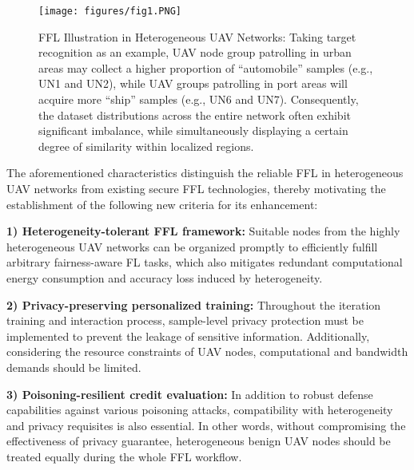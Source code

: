 \documentclass[lettersize,journal]{IEEEtran}
\begin{document}
\begin{figure}[!t]
\centering
\texttt{[image: figures/fig1.PNG]}
\caption{FFL Illustration in Heterogeneous UAV Networks: Taking target recognition as an example, UAV node group patrolling in urban areas may collect a higher proportion of ``automobile'' samples (e.g., UN1 and UN2), while UAV groups patrolling in port areas will acquire more ``ship'' samples (e.g., UN6 and UN7). Consequently, the dataset distributions across the entire network often exhibit significant imbalance, while simultaneously displaying a certain degree of similarity within localized regions.
}
\label{fig1:UAV-Network}
\end{figure}

The aforementioned characteristics distinguish the reliable FFL in heterogeneous UAV networks from existing secure FFL technologies, thereby motivating the establishment of the following new criteria for its enhancement:

\textbf{1) Heterogeneity-tolerant FFL framework:} Suitable nodes from the highly heterogeneous UAV networks can be organized promptly to efficiently fulfill arbitrary fairness-aware FL tasks, which also mitigates redundant computational energy consumption and accuracy loss induced by heterogeneity.

\textbf{2) Privacy-preserving personalized training:} Throughout the iteration training and interaction process, sample-level privacy protection must be implemented to prevent the leakage of sensitive information. Additionally, considering the resource constraints of UAV nodes, computational and bandwidth demands should be limited.

\textbf{3) Poisoning-resilient credit evaluation:} In addition to robust defense capabilities against various poisoning attacks, compatibility with heterogeneity and privacy requisites is also essential. In other words, without compromising the effectiveness of privacy guarantee, heterogeneous benign UAV nodes should be treated equally during the whole FFL workflow.%
\end{document}
